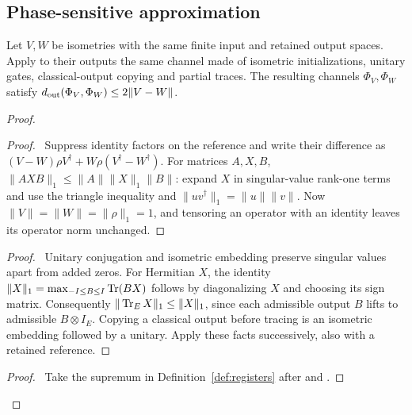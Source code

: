 \subsection{Phase-sensitive approximation}

\begin{lemma}
\label{eqv:error-lemma}
Let $V,W$ be isometries with the same finite input and retained output
spaces. Apply to their outputs the same channel made of isometric
initializations, unitary gates, classical-output copying and partial
traces. The resulting channels $\Phi_V,\Phi_W$ satisfy
$d_{\rm out}(\Phi_V,\Phi_W)\leq2\|V-W\|$.
\end{lemma}
\begin{proof}
 \begin{proof}\pf\ Suppress identity factors on the reference and
 write their difference as
 $(V-W)\rho V^\dagger+W\rho(V^\dagger-W^\dagger)$.
 For matrices $A,X,B$, $\|AXB\|_1\leq\|A\|\|X\|_1\|B\|$:
 expand $X$ in singular-value rank-one terms and use the triangle
 inequality and $\|uv^\dagger\|_1=\|u\|\|v\|$.
 Now $\|V\|=\|W\|=\|\rho\|_1=1$, and tensoring an operator
 with an identity leaves its operator norm unchanged.\end{proof}
 \begin{proof}\pf\ Unitary conjugation and isometric embedding
 preserve singular values apart from added zeros. For Hermitian
 $X$, the identity
 $\|X\|_1=\max_{-I\leq B\leq I}\operatorname{Tr}(BX)$ follows by diagonalizing
 $X$ and choosing its sign matrix. Consequently
 $\|\operatorname{Tr}_E X\|_1\leq\|X\|_1$, since each admissible output $B$
 lifts to admissible $B\otimes I_E$. Copying a classical output
 before tracing is an isometric embedding followed by a unitary.
 Apply these facts successively, also with a retained reference.
\end{proof}
 \qedstep
 \begin{proof}\pf\ Take the supremum in Definition~\ref{def:registers}
 after  and .
\end{proof}
\end{proof}

